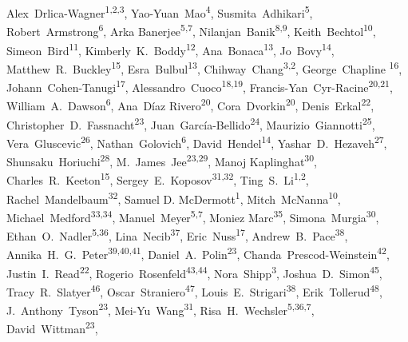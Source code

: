 
\def\altaffilmark#1{\textsuperscript{#1}}
\def\affil#1{\noindent #1 \\}

\begin{raggedright}
\small
Alex~Drlica-Wagner\altaffilmark{1,2,3},
Yao-Yuan~Mao\altaffilmark{4},
Susmita~Adhikari\altaffilmark{5},
Robert~Armstrong\altaffilmark{6},
Arka Banerjee\altaffilmark{5,7},
Nilanjan~Banik\altaffilmark{8,9},
Keith~Bechtol\altaffilmark{10},
Simeon~Bird\altaffilmark{11},
Kimberly~K.~Boddy\altaffilmark{12},
Ana~Bonaca\altaffilmark{13},
Jo~Bovy\altaffilmark{14},
Matthew~R.~Buckley\altaffilmark{15},
Esra~Bulbul\altaffilmark{13},
Chihway~Chang\altaffilmark{3,2},
George~Chapline \altaffilmark{16},
Johann~Cohen-Tanugi\altaffilmark{17},
Alessandro~Cuoco\altaffilmark{18,19},
Francis-Yan~Cyr-Racine\altaffilmark{20,21},
William~A.~Dawson\altaffilmark{6},
Ana~D\'{i}az Rivero\altaffilmark{20},
Cora~Dvorkin\altaffilmark{20},
Denis~Erkal\altaffilmark{22},
Christopher~D.~Fassnacht\altaffilmark{23},
Juan~Garc\'ia-Bellido\altaffilmark{24},
Maurizio~Giannotti\altaffilmark{25},
Vera~Gluscevic\altaffilmark{26},
Nathan~Golovich\altaffilmark{6},
David~Hendel\altaffilmark{14},
Yashar~D.~Hezaveh\altaffilmark{27},
Shunsaku~Horiuchi\altaffilmark{28},
M.~James~Jee\altaffilmark{23,29},
Manoj Kaplinghat\altaffilmark{30},
Charles~R.~Keeton\altaffilmark{15},
Sergey~E.~Koposov\altaffilmark{31,32},
Ting~S.~Li\altaffilmark{1,2},
Rachel~Mandelbaum\altaffilmark{32},
Samuel D. McDermott\altaffilmark{1},
Mitch~McNanna\altaffilmark{10},
Michael~Medford\altaffilmark{33,34},
Manuel~Meyer\altaffilmark{5,7},
Moniez Marc\altaffilmark{35},
Simona~Murgia\altaffilmark{30},
Ethan~O.~Nadler\altaffilmark{5,36},
Lina~Necib\altaffilmark{37},
Eric~Nuss\altaffilmark{17},
Andrew~B.~Pace\altaffilmark{38},
Annika~H.~G.~Peter\altaffilmark{39,40,41},
Daniel~A.~Polin\altaffilmark{23},
Chanda~Prescod-Weinstein\altaffilmark{42},
Justin~I.~Read\altaffilmark{22},
Rogerio~Rosenfeld\altaffilmark{43,44},
Nora~Shipp\altaffilmark{3},
Joshua~D.~Simon\altaffilmark{45},
Tracy~R.~Slatyer\altaffilmark{46},
Oscar~Straniero\altaffilmark{47},
Louis~E.~Strigari\altaffilmark{38},
Erik~Tollerud\altaffilmark{48},
J.~Anthony~Tyson\altaffilmark{23},
Mei-Yu~Wang\altaffilmark{31},
Risa~H.~Wechsler\altaffilmark{5,36,7},
David~Wittman\altaffilmark{23},

\end{raggedright}

